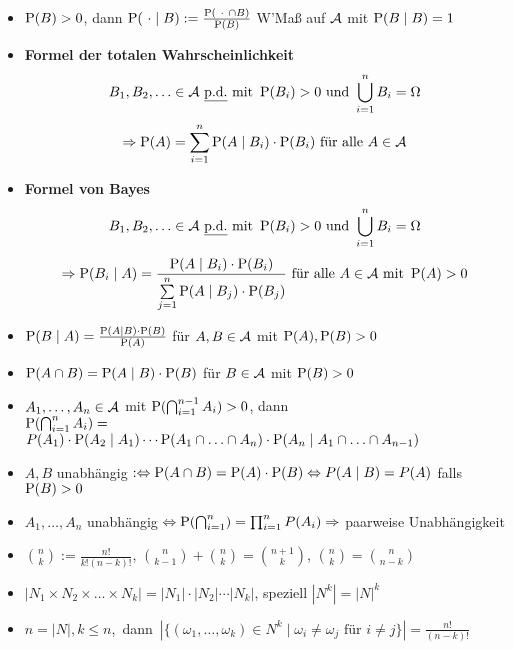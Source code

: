 \begin{itemize}
\item $\P(B)>0$, dann $\P(\ \cdot\mid B) := \frac{\P(\ \cdot\ \cap B)}{\P(B)}$
W'Maß auf $\A$ mit $\P(B\mid B)=1$

\item \textbf{Formel der totalen Wahrscheinlichkeit}
\[
	B_1, B_2,\ldots \in\A \text{ \underline{p.d.} mit } \P(B_i)>0 \text{ und } 
	\bigcup_{i=1}^{n} B_i = \Omega
\]
\[
	\Rightarrow \P(A)=\sum_{i=1}^{n} \P(A\mid B_i)\cdot\P(B_i)
	\text{ für alle } A\in\A
\]

\item \textbf{Formel von Bayes}
\[
	B_1, B_2,\ldots \in\A \text{ \underline{p.d.} mit } \P(B_i)>0 \text{ und }  
	\bigcup_{i=1}^{n} B_i = \Omega
\]
\[
	\Rightarrow\P(B_i\mid A)=
	\frac{\P(A\mid B_i)\cdot\P(B_i)}{\sum\limits_{j=1}^{n} \P(A\mid B_j)\cdot\P(B_j)}\ 
	\text{für alle } A\in\A \text{ mit } \P(A)>0
\]

\item $\P(B\mid A)=\frac{\P(A\mid B)\cdot\P(B)}{\P(A)}$ für $A,B\in\A$ mit
$\P(A),\P(B)>0$

\item $\P(A\cap B)=\P(A\mid B)\cdot\P(B)$ für $B\in\A$ mit $\P(B)>0$

\item $A_1,\ldots ,A_n\in\A$ mit $\P(\bigcap_{i=1}^{n-1} A_i)>0$, dann\\
$\P(\bigcap_{i=1}^{n} A_i)=$ 
$P(A_1)\cdot\P(A_2\mid A_1)\cdots
\P(A_1\cap\ldots\cap A_n)\cdot\P(A_n\mid A_1\cap\ldots\cap A_{n-1})$

\item $A,B$ unabhängig $:\Leftrightarrow \P(A\cap B)=\P(A)\cdot\P(B)
\Leftrightarrow P(A\mid B) = P(A)$ falls $\P(B)>0$

\item $A_1,\ldots ,A_n$ unabhängig 
$\Leftrightarrow\P(\bigcap_{i=1}^{n})=\prod_{i=1}^{n} P(A_i)
\Rightarrow$ paarweise Unabhängigkeit

\item $\binom{n}{k}:= \frac{n!}{k!(n-k)!}$, 
$\binom{n}{k-1}+\binom{n}{k}=\binom{n+1}{k}$,
$\binom{n}{k}=\binom{n}{n-k}$

\item $ |N_1 \times N_2 \times\dots\times N_k| = |N_1| \cdot |N_2| \cdots |N_k|$,
speziell $|N^k| = {|N|}^k$

\item \mbox{$n=|N|,k\leq n$, dann $|\{(\omega_1,\ldots,\omega_k)\in N^k 
\mid\omega_i\neq\omega_j\text { für }i\neq j\}|=\frac{n!}{(n-k)!}$}


\end{itemize}
